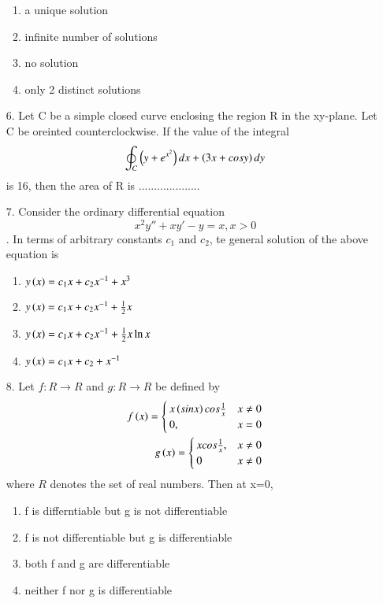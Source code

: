 \documentclass[journal]{IEEEtran}
\begin{document}
\begin{enumerate}
    \begin{enumerate}[label = (\Alph*)]
        \item a unique solution 
        \item infinite number of solutions
        \item no solution
        \item only 2 distinct solutions
    \end{enumerate}
    \item[6.] Let C be a simple closed curve enclosing the region R in the xy-plane. Let C be oreinted counterclockwise. If the value of the integral $$\oint_C \left(y+e^{x^2}\right)dx + \left(3x+cosy\right)dy$$ is 16, then the area of R is ....................
    \item[7.] Consider the ordinary differential equation $$x^2y''+xy'-y=x, x>0$$. In terms of arbitrary constants $c_1$ and $c_2$, te general solution of the above equation is 
    \begin{enumerate}[label = (\Alph*)]
        \item $y\left(x\right) = c_1x+c_2x^{-1}+x^3$
        \item $y\left(x\right) = c_1x+c_2x^{-1}+\frac{1}{2}x$
        \item $y\left(x\right) = c_1x+c_2x^{-1}+\frac{1}{2}x\ln x$
        \item $y\left(x\right) = c_1x+c_2+x^{-1}$
    \end{enumerate}
    \item[8.] Let $f:R\rightarrow R$ and $g:R\rightarrow R$ be defined by \begin{align*}f\left(x\right)=\begin{cases}x\left(sinx\right)cos\frac{1}{x} & x\neq 0\\0,&x=0\end{cases}\\g\left(x\right)=\begin{cases}xcos\frac{1}{x},&x\neq 0\\0 &x\neq 0\end{cases}\end{align*} where $R$ denotes the set of real numbers. Then at x=0,
    \begin{enumerate}[label = (\Alph*)]
       \item f is differntiable but g is not differentiable
       \item f is not differentiable but g is differentiable
       \item both f and g are differentiable
       \item neither f nor g is differentiable

\end{enumerate}
\end{enumerate}
\end{document}
